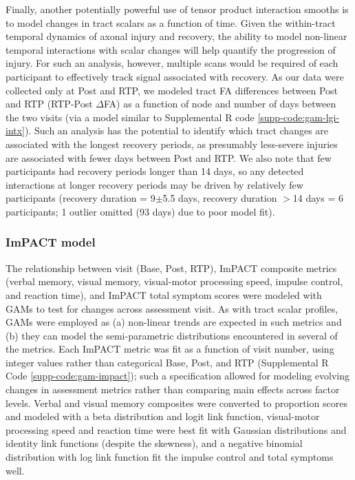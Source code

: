 \documentclass[12pt]{article}
\begin{document}
Finally, another potentially powerful use of tensor product interaction smooths is to model changes in tract scalars as a function of time. Given the within-tract temporal dynamics of axonal injury and recovery, the ability to model non-linear temporal interactions with scalar changes will help quantify the progression of injury. For such an analysis, however, multiple scans would be required of each participant to effectively track signal associated with recovery. As our data were collected only at Post and RTP, we modeled tract FA differences between Post and RTP (RTP-Post $\Delta$FA) as a function of node and number of days between the two visits (via a model similar to Supplemental R code \ref{supp-code:gam-lgi-intx}). Such an analysis has the potential to identify which tract changes are associated with the longest recovery periods, as presumably less-severe injuries are associated with fewer days between Post and RTP. We also note that few participants had recovery periods longer than 14 days, so any detected interactions at longer recovery periods may be driven by relatively few participants (recovery duration = 9$\pm$5.5 days, recovery duration $>$14 days = 6 participants; 1 outlier omitted (93 days) due to poor model fit).

\subsubsection{ImPACT model}
\label{sssec:meth-gam-impact}
The relationship between visit (Base, Post, RTP), ImPACT composite metrics (verbal memory, visual memory, visual-motor processing speed, impulse control, and reaction time), and ImPACT total symptom scores were modeled with GAMs to test for changes across assessment visit. As with tract scalar profiles, GAMs were employed as (a) non-linear trends are expected in such metrics and (b) they can model the semi-parametric distributions encountered in several of the metrics. Each ImPACT metric was fit as a function of visit number, using integer values rather than categorical Base, Post, and RTP (Supplemental R Code \ref{supp-code:gam-impact}); such a specification allowed for modeling evolving changes in assessment metrics rather than comparing main effects across factor levels. Verbal and visual memory composites were converted to proportion scores and modeled with a beta distribution and logit link function, visual-motor processing speed and reaction time were best fit with Gaussian distributions and identity link functions (despite the skewness), and a negative binomial distribution with log link function fit the impulse control and total symptoms well.
\end{document}
